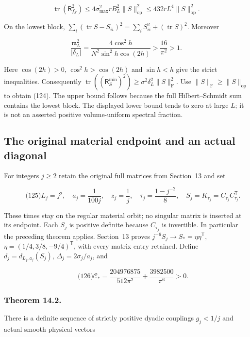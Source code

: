 \[
\operatorname{tr}(\mathsf R_{f_S}^2)
 \le 4\sigma_{\max}^2rB_L^2\|S\|_{\mathrm{op}}^2
 \le432rL^4\|S\|_{\mathrm{op}}^2.
\]

On the lowest block, \(\sum_i(\operatorname{tr}S-S_{ii})^2
=\sum_iS_{ii}^2+(\operatorname{tr}S)^2\). Moreover

\[
\frac{\mathfrak m_L^2}{|\delta_L|}
 =\frac{4\cos^2h}{N^2\sin^2h\cos(2h)}
 >\frac{16}{\pi^2}>1.
\]

Here \(\cos(2h)>0\), \(\cos^2h>\cos(2h)\) and \(\sin h<h\) give the
strict inequalities. Consequently
\(\operatorname{tr}((\mathsf R_S^{\min})^2)
\ge\sigma^2\delta_L^2\|S\|_{\mathrm F}^2\). Use
\(\|S\|_{\mathrm F}\ge\|S\|_{\mathrm{op}}\) to obtain (124). The upper
bound follows because the full Hilbert--Schmidt sum contains the lowest
block. The displayed lower bound tends to zero at large \(L\); it is not
an asserted positive volume-uniform spectral fraction.

\subsection{The original material endpoint and an actual
diagonal}\label{fabel-low-mode-transfer-md-the-original-material-endpoint-and-an-actual-diagonal}

For integers \(j\ge2\) retain the original full matrices from Section~13
and set

\[
\qquad\text{(125)}
 L_j=j^2,\quad a_j=\frac1{100j},\quad z_j=\frac1j,\quad
 \tau_j=\frac{1-j^{-2}}8,\quad S_j=K_{\tau_j}=C_{\tau_j}C_{\tau_j}^{\mathsf T}.
\]

These times stay on the regular material orbit; no singular matrix is
inserted at its endpoint. Each \(S_j\) is positive definite because
\(C_{\tau_j}\) is invertible. In particular the preceding theorem
applies. Section~13 proves \(j^{-6}S_j\to S_*=\eta\eta^{\mathsf T}\),
\(\eta=(1/4,3/8,-9/4)^{\mathsf T}\), with every matrix entry retained.
Define \(d_j=d_{L_j,a_j}(S_j)\), \(\Delta_j=2\sigma_j/a_j\), and

\[
\qquad\text{(126)}
 \mathcal C_*=
 \frac{204976875}{512\pi^2}+\frac{3982500}{\pi^6}>0 .
\]

\subsubsection{Theorem 14.2.}\label{fabel-low-mode-transfer-md-theorem-14.2.}

There is a definite sequence of strictly positive dyadic couplings
\(g_j<1/j\) and actual smooth physical vectors

